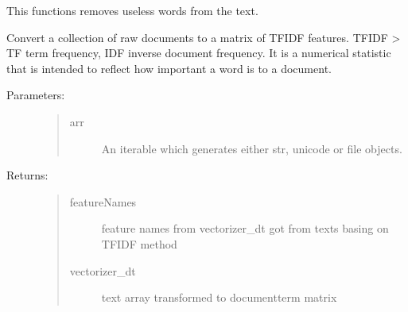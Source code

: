 \documentclass[letterpaper,10pt,english]{sphinxmanual}
\begin{document}
\begin{fulllineitems}
\label{\detokenize{func:func.getFeatureNamesFromTFIDFVectorizer}}
\pysigstartsignatures
{}
\pysigstopsignatures
\sphinxAtStartPar
This functions removes useless words from the text.

\sphinxAtStartPar
Convert a collection of raw documents to a matrix of TF\sphinxhyphen{}IDF features.
TF\sphinxhyphen{}IDF \textendash{}\textgreater{} TF \textendash{} term frequency, IDF \textendash{} inverse document frequency.
It is a numerical statistic that is intended to reflect how important a word is to a document.
\begin{description}
\item[{Parameters:}] \leavevmode\begin{quote}\begin{description}
\item[{arr}] \leavevmode
\sphinxAtStartPar
An iterable which generates either str, unicode or file objects.

\end{description}\end{quote}

\item[{Returns:}] \leavevmode\begin{quote}\begin{description}
\item[{featureNames}] \leavevmode
\sphinxAtStartPar
feature names from vectorizer\_dt got from texts basing on TF\sphinxhyphen{}IDF method

\item[{vectorizer\_dt}] \leavevmode
\sphinxAtStartPar
text array transformed to document\sphinxhyphen{}term matrix

\end{description}\end{quote}

\end{description}

\end{fulllineitems}

\end{document}

